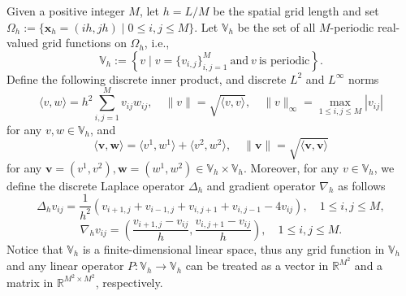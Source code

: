 \documentclass{m2an}
\begin{document}
Given a positive integer $ M $, let $ h = L/M $ be the spatial grid length and set $ \Omega_{h} := \{ \mathbf{x}_{h} = ( ih, jh ) \mid 0 \leq i,j \leq M \} $. Let $ \mathbb{V}_h $ be the set of all $M$-periodic real-valued grid functions on $ \Omega_{h} $, i.e.,
$$
\mathbb{V}_h:=\left\{v \mid v= \{v_{i,j}\}_{i,j=1}^{M}~ \text{and}~  v ~ \text{is periodic}\right\} .
$$ %
Define the following discrete inner product, and discrete $ L^2 $ and $ L^{\infty} $ norms
$$
\langle v, w\rangle=h^2 \sum_{i, j=1}^M v_{i j} w_{i j}, \quad\|v\|=\sqrt{\langle v, v\rangle}, \quad\|v\|_{\infty}=\max _{1 \leq i, j \leq M} |v_{i j}|
$$
for any $v, w \in \mathbb{V}_h$, and
$$
\langle \mathbf{v}, \mathbf{w}\rangle = \langle v^1, w^1\rangle + \langle v^2, w^2\rangle,  \quad \|\mathbf{v}\|=\sqrt{\langle\mathbf{v}, \mathbf{v}\rangle}
$$
for any $\mathbf{v} = (v^1, v^2), \mathbf{w}= (w^1, w^2) \in \mathbb{V}_h \times \mathbb{V}_h$. 
Moreover, for any $ v \in \mathbb{V}_h $, we define the discrete Laplace operator $\Delta_h$ and gradient operator $\nabla_h$ as follows
$$
\Delta_h v_{i j}=\frac{1}{h^2}\left(v_{i+1, j}+v_{i-1, j}+v_{i, j+1}+v_{i, j-1}-4 v_{i j}\right), \quad 1 \leq i, j \leq M,
$$
$$
\nabla_h v_{i j}=\left(\frac{v_{i+1, j}-v_{i j}}{h}, \frac{v_{i, j+1}-v_{i j}}{h}\right), \quad 1 \leq i, j \leq M .
$$
Notice that $ \mathbb{V}_h $ is a finite-dimensional linear space, thus any grid function in $ \mathbb{V}_h $ and any linear operator $ P: \mathbb{V}_h \rightarrow \mathbb{V}_h $ can be treated as a vector in $ \mathbb{R}^{M^2} $ and a matrix
in $ \mathbb{R}^{M^2 \times M^2 } $, respectively.

\end{document}
